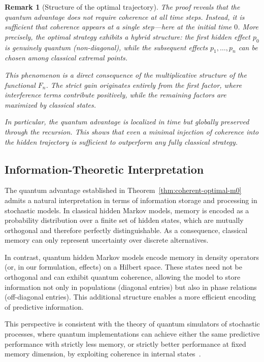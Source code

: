 \documentclass[12pt, reco]{article}
\newtheorem{remark}[theorem]{Remark}
\begin{document}
\begin{remark}[Structure of the optimal trajectory]
\label{rem:hybrid-trajectory}
The proof reveals that the quantum advantage does not require coherence at all time steps. 
Instead, it is sufficient that coherence appears at a single step—here at the initial time \(0\). 
More precisely, the optimal strategy exhibits a \emph{hybrid structure}: the first hidden effect 
\(p_0\) is genuinely quantum (non-diagonal), while the subsequent effects 
\(p_1,\dots,p_n\) can be chosen among classical extremal points.

This phenomenon is a direct consequence of the multiplicative structure of the functional \(F_n\). 
The strict gain originates entirely from the first factor, where interference terms contribute 
positively, while the remaining factors are maximized by classical states. 

In particular, the quantum advantage is \emph{localized in time} but \emph{globally preserved} 
through the recursion. This shows that even a minimal injection of coherence into the hidden 
trajectory is sufficient to outperform any fully classical strategy.
\end{remark}




\subsection{Information-Theoretic Interpretation}

The quantum advantage established in Theorem~\ref{thm:coherent-optimal-m0} admits a natural interpretation in terms of information storage and processing in stochastic models. In classical hidden Markov models, memory is encoded as a probability distribution over a finite set of hidden states, which are mutually orthogonal and therefore perfectly distinguishable. As a consequence, classical memory can only represent uncertainty over discrete alternatives.

In contrast, quantum hidden Markov models encode memory in density operators (or, in our formulation, effects) on a Hilbert space. These states need not be orthogonal and can exhibit quantum coherence, allowing the model to store information not only in populations (diagonal entries) but also in phase relations (off-diagonal entries). This additional structure enables a more efficient encoding of predictive information.

This perspective is consistent with the theory of quantum simulators of stochastic processes, where quantum implementations can achieve either the same predictive performance with strictly less memory, or strictly better performance at fixed memory dimension, by exploiting coherence in internal states~\cite{Banchi24}.
\end{document}
